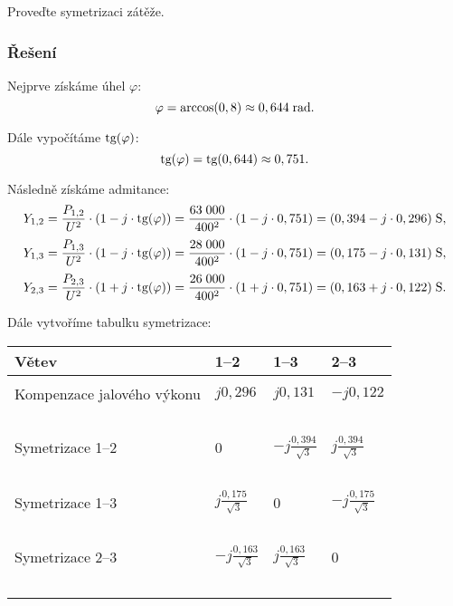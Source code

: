 \documentclass{article}
\begin{document}
Proveďte symetrizaci zátěže.


\subsubsection{Řešení}
Nejprve získáme úhel $\varphi$:
$$
    \varphi = \textrm{arccos} (0,8) \approx 0,644 \; \textrm{rad}.
$$

Dále vypočítáme $\textrm{tg} (\varphi)$:
$$
    \textrm{tg} (\varphi) = \textrm{tg} (0,644) \approx 0,751.
$$

Následně získáme admitance:
$$
    Y_{1,2} = \frac{P_{1,2}}{U^2} \cdot (1 - j \cdot \textrm{tg} (\varphi)) = \frac{63 \; 000}{400^2} \cdot (1 - j \cdot 0,751) = (0,394 - j \cdot 0,296) \; \textrm{S},
$$
$$
    Y_{1,3} = \frac{P_{1,3}}{U^2} \cdot (1 - j \cdot \textrm{tg} (\varphi)) = \frac{28 \; 000}{400^2} \cdot (1 - j \cdot 0,751) = (0,175 - j \cdot 0,131) \; \textrm{S},
$$
$$
    Y_{2,3} = \frac{P_{2,3}}{U^2} \cdot (1 + j \cdot \textrm{tg} (\varphi)) = \frac{26 \; 000}{400^2} \cdot (1 + j \cdot 0,751) = (0,163 + j \cdot 0,122) \; \textrm{S}.
$$

Dále vytvoříme tabulku symetrizace:
\begin{table}[H]
    \centering
    \begin{tabular}{l l l l}
        \hline
        Větev                      & 1--2                        & 1--3                        & 2--3                        \\
        \hline                                                                                                               \\
        Kompenzace jalového výkonu & $j 0,296$                   & $j 0,131$                   & $-j 0,122$                  \\~\\
        Symetrizace 1--2           & 0                           & $-j \frac{0,394}{\sqrt{3}}$ & $j \frac{0,394}{\sqrt{3}}$  \\~\\
        Symetrizace 1--3           & $j \frac{0,175}{\sqrt{3}}$  & 0                           & $-j \frac{0,175}{\sqrt{3}}$ \\~\\
        Symetrizace 2--3           & $-j \frac{0,163}{\sqrt{3}}$ & $j \frac{0,163}{\sqrt{3}}$  & 0                           \\~\\
        \hline
    \end{tabular}
\end{table}
\end{document}
